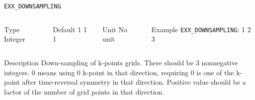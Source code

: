 \documentclass[xcolor=dvipsnames,t]{beamer}
\begin{document}
\begin{frame}[allowframebreaks]{\texttt{EXX\_DOWNSAMPLING}} \label{EXX_DOWNSAMPLING}
\vspace*{-12pt}
\begin{columns}
\begin{block}{Type}
Integer
\end{block}

\begin{block}{Default}
1 1 1
\end{block}

\begin{block}{Unit}
No unit
\end{block}

\begin{block}{Example}
\texttt{EXX\_DOWNSAMPLING}: 1 2 3
\end{block}
\end{columns}

\begin{block}{Description}
Down-sampling of k-points grids. There should be 3 nonnegative integers. 0 means using 0 k-point in that direction, 
requiring 0 is one of the k-point after time-reversal symmetry in that direction. 
Positive value should be a factor of the number of grid points in that direction. 
\end{block}

\end{frame}
\end{document}
